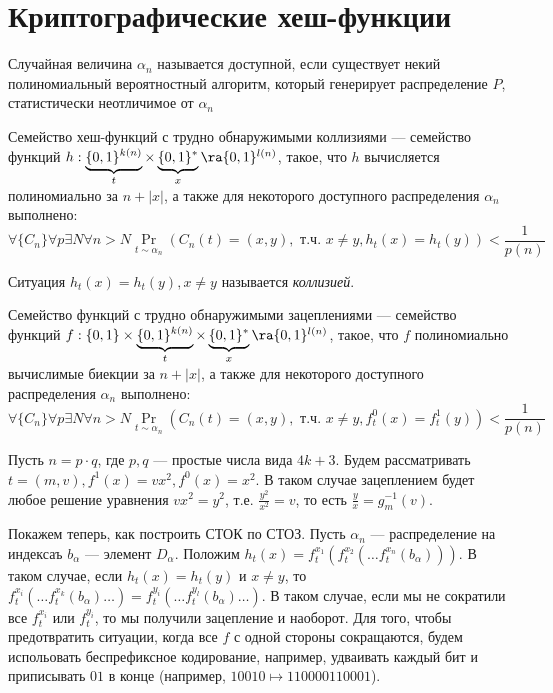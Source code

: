
\section{Криптографические хеш-функции}

\begin{definition}
    Случайная величина \(\alpha_n\) называется доступной, если существует некий полиномиальный вероятностный алгоритм, который генерирует распределение \(P\), статистически неотличимое от \(\alpha_n\)
\end{definition}

\begin{definition}
    Семейство хеш-функций с трудно обнаружимыми коллизиями --- семейство функций \(h: \underbrace{\{0, 1\}^{k(n)}}_t \times \underbrace{\{0, 1\}^*}_x \ra \{0, 1\}^{l(n)}\), такое, что \(h\) вычисляется полиномиально за \(n + |x|\), а также для некоторого доступного распределения \(\alpha_n\) выполнено:
    \[\forall \{C_n\} \forall p \exists N \forall n > N \Pr_{t \sim \alpha_n}(C_n(t) = (x, y),\text{ т.ч. }x \ne y, h_t(x) = h_t(y)) < \frac{1}{p(n)}\]
\end{definition}

\begin{note}
    Ситуация \(h_t(x) = h_t(y), x \ne y\) называется \emph{коллизией}.
\end{note}

\begin{definition}
    Семейство функций с трудно обнаружимыми зацеплениями --- семейство функций \(f: \{0, 1\} \times \underbrace{\{0, 1\}^{k(n)}}_t \times \underbrace{\{0, 1\}^*}_x \ra \{0, 1\}^{l(n)}\), такое, что \(f\) полиномиально вычислимые биекции за \(n + |x|\), а также для некоторого доступного распределения \(\alpha_n\) выполнено:
    \[\forall \{C_n\} \forall p \exists N \forall n > N \Pr_{t \sim \alpha_n}(C_n(t) = (x, y),\text{ т.ч. }x \ne y, f^0_t(x) = f^1_t(y)) < \frac{1}{p(n)}\]
\end{definition}

\begin{example}
    Пусть \(n = p\cdot q\), где \(p, q\) --- простые числа вида \(4k + 3\). Будем рассматривать \(t = (m, v), f^1(x) = vx^2, f^0(x) = x^2\). В таком случае зацеплением будет любое решение уравнения \(vx^2 = y^2\), т.е. \(\frac{y^2}{x^2} = v\), то есть \(\frac{y}{x} = g_m^{-1}(v)\).
\end{example}

Покажем теперь, как построить СТОК по СТОЗ. Пусть \(\alpha_n\) --- распределение на индексаъ \(b_\alpha\) --- элемент \(D_\alpha\). Положим \(h_t(x) = f_t^{x_1}(f_t^{x_2}(\dots f_t^{x_n}(b_\alpha)))\). В таком случае, если \(h_t(x) = h_t(y)\) и \(x \ne y\), то \(f_t^{x_i}(\dots f_t^{x_k}(b_\alpha) \dots) = f_t^{y_i}(\dots f_t^{y_l}(b_\alpha)\dots )\). В таком случае, если мы не сократили все \(f_t^{x_i}\) или \(f_t^{y_i}\), то мы получили зацепление и наоборот. Для того, чтобы предотвратить ситуации, когда все \(f\) с одной стороны сокращаются, будем испольовать беспрефиксное кодирование, например, удваивать каждый бит и приписывать \(01\) в конце (например, \(10010 \mapsto 110000110001\)).

